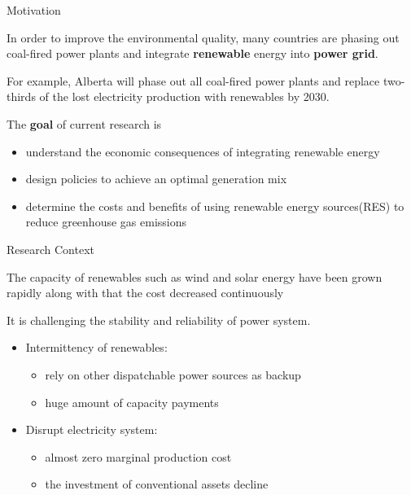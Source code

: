 \documentclass[newPxFont,numfooter,progressbar,sectionpages]{beamer}
\begin{document}
\begin{frame}[c]{Motivation}

In order to improve the environmental quality, many countries are phasing out coal-fired power plants and integrate \textbf{renewable} energy into \textbf{power grid}.  

For example, Alberta will phase out all coal-fired power plants and replace two-thirds of the lost electricity production with renewables by 2030.


The \textbf{goal} of current research is 

\begin{itemize}
	\item understand the economic consequences of integrating renewable energy
	\item design policies to achieve an optimal generation mix
	\item determine the costs and benefits of using renewable energy sources(RES) to reduce greenhouse gas emissions
\end{itemize}


\end{frame}



\begin{frame}[c]{Research Context}

The capacity of renewables such as wind and solar energy have been grown rapidly along with that the cost decreased continuously   

It is challenging the stability and reliability of power system.
\begin{itemize}

\item Intermittency of renewables:

\begin{itemize}
	\item rely on other dispatchable power sources as backup
	\item huge amount of capacity payments
\end{itemize}

\item Disrupt electricity system: 
\begin{itemize}
	\item almost zero marginal production cost
	\item the investment of conventional assets decline
\end{itemize}	


\end{itemize} 


\end{frame}
\end{document}
